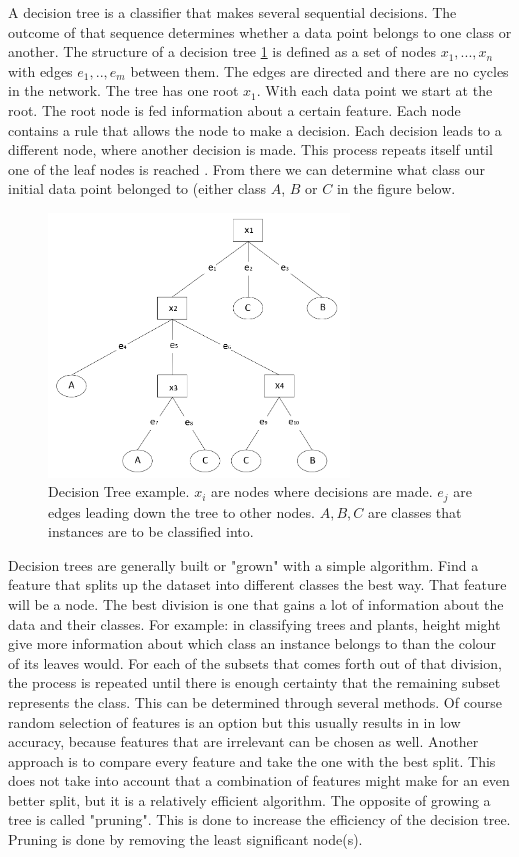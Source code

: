 A decision tree is a classifier that makes several sequential decisions. The outcome of that sequence determines whether a data point belongs to one class or another. The structure of a decision tree \ref{fig:DT} is defined as a set of nodes ${x_1, ... , x_n}$ with edges ${e_1, .., e_{m}}$ between them. The edges are directed and there are no cycles in the network. The tree has one root $x_1$. With each data point we start at the root. The root node is fed information about a certain feature. Each node contains a rule that allows the node to make a decision. Each decision leads to a different node, where another decision is made. This process repeats itself until one of the leaf nodes is reached \cite{safavian1991survey}. From there we can determine what class our initial data point belonged to (either class $A$, $B$ or $C$ in the figure below. 
\begin{figure}[H]
    \includegraphics[width=80mm]{./img/decisiontree.png}
    \caption{Decision Tree example. $x_i$ are nodes where decisions are made. $e_j$ are edges leading down the tree to other nodes. $A,B,C$ are classes that instances are to be classified into.}
    \label{fig:DT}
\end{figure}

Decision trees are generally built or "grown" with a simple algorithm. Find a feature that splits up the dataset into different classes the best way. That feature will be a node. The best division is one that gains a lot of information about the data and their classes. For example: in classifying trees and plants, height might give more information about which class an instance belongs to than the colour of its leaves would. For each of the subsets that comes forth out of that division, the process is repeated until there is enough certainty that the remaining subset represents the class. This can be determined through several methods. Of course random selection of features is an option but this usually results in in low accuracy, because features that are irrelevant can be chosen as well. Another approach is to compare every feature and take the one with the best split. This does not take into account that a combination of features might make for an even better split, but it is a relatively efficient algorithm. 
The opposite of growing a tree is called "pruning". This is done to increase the efficiency of the decision tree. Pruning is done by removing the least significant node(s).

